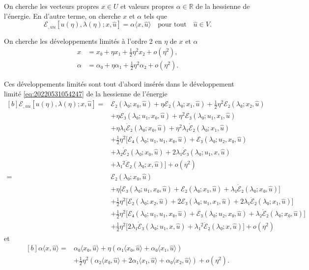 \documentclass[12pt, final]{amsart}
\theoremstyle{definition}
\newcommand{\reals}{\mathbb{R}}
\begin{document}
On cherche les vecteurs propres \(x ∈ U\) et valeurs propres \(α ∈ \reals\) de
la hessienne de l'énergie. En d'autre terme, on cherche \(x\) et \(α\) tels que
\begin{equation}
 ℰ_{, u u} [u(η), λ(η); x, \hat{u}] = α 〈 x, \hat{u} 〉 \quad \text{pour tout} \quad \hat{u} ∈ V.
\end{equation}

On cherche les développements limités à l'ordre 2 en \(η\) de \(x\) et \(α\)
\begin{align*}
 x & = x₀ + η x₁ + \tfrac{1}{2} η^2 x₂ + o(η^2),\\
 α & = α₀ + η α₁ + \tfrac{1}{2} η^2 α₂ + o(η^2).
\end{align*}

Ces développements limités sont tout d'abord insérés dans le développement
limité \eqref{eq:20220531054247} de la hessienne de l'énergie
\begin{equation*}
  \begin{aligned}[b]
    ℰ_{, u u} [u(η), λ(η); x, \hat{u}]
    ={} & ℰ₂(λ₀; x₀, \hat{u}) + η ℰ₂(λ₀ ; x₁, \hat{u}) + \tfrac{1}{2} η^2 ℰ₂(λ₀; x₂, \hat{u})\\
    & + η ℰ₃(λ₀; u₁, x₀, \hat{u}) + η^2 ℰ₃(λ₀; u₁, x₁, \hat{u})\\
    & + η λ₁ \dot{ℰ}₂(λ₀; x₀, \hat{u}) + η^2 λ₁ \dot{ℰ}₂(λ₀; x₁, \hat{u})\\
    & + \tfrac{1}{2} η^2 \bigl[ℰ₄(λ₀; u₁, u₁, x₀, \hat{u}) + ℰ₃(λ₀; u₂, x₀, \hat{u})\\
    & + λ₂ \dot{ℰ}₂(λ₀; x₀, \hat{u}) + 2 λ₁ \dot{ℰ}₃(λ₀; u₁, x, \hat{u})\\
    & + λ₁^2 \ddot{ℰ}₂(λ₀; x, \hat{u}) \bigr] + o(η^2)\\
    ={} & ℰ₂(λ₀; x₀, \hat{u})\\
    & + η \bigl[ℰ₃(λ₀; u₁, x₀, \hat{u}) + ℰ₂ (λ₀; x₁, \hat{u}) + λ₁ \dot{ℰ}₂(λ₀ ; x₀, \hat{u})\bigr]\\
    & + \tfrac{1}{2} η^2 \bigl[ℰ₂(λ₀; x₂, \hat{u}) + 2ℰ₃(λ₀; u₁, x₁, \hat{u}) + 2 λ₁ \dot{ℰ}₂(λ₀; x₁, \hat{u})\bigr]\\
    & + \tfrac{1}{2} η^2 \bigl[ℰ₄(λ₀; u₁, u₁, x₀, \hat{u}) + ℰ₃(λ₀; u₂, x₀, \hat{u}) + λ₂ \dot{ℰ}₂(λ₀; x₀, \hat{u})\bigr]\\
    & + \tfrac{1}{2} η^2 \bigl[2 λ₁ \dot{ℰ}₃(λ₀ ; u₁, x, \hat{u}) + λ₁^2 \ddot{ℰ}₂(λ₀; x, \hat{u})\bigr] + o(η^2)
  \end{aligned}
\end{equation*}
et
\begin{equation*}
  \begin{aligned}[b]
    α 〈 x, \hat{u} 〉
    ={} & α₀ 〈 x₀, \hat{u} 〉 + η(α₁ 〈 x₀, \hat{u} 〉 + α₀ 〈 x₁, \hat{u} 〉)\\
    & + \tfrac{1}{2} η^2 (α₂ 〈 x₀, \hat{u} 〉 + 2 α₁ 〈 x₁, \hat{u} 〉 + α₀ 〈 x₂, \hat{u} 〉) + o(η^2) .
  \end{aligned}
\end{equation*}
\end{document}
